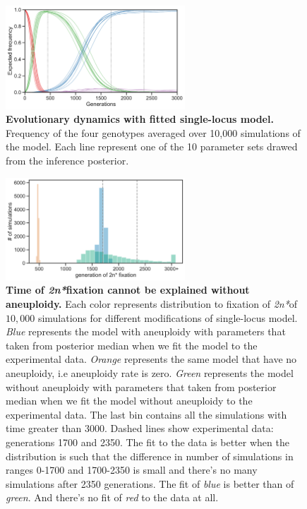 \documentclass[12pt]{extarticle}
\newcommand{\eumt}{\emph{2n*}}
\begin{document}
\begin{figure}[h!]
  \centering
\includegraphics[width=0.6\textwidth]{../figures/ppc-plot.pdf}
  \caption{
  \textbf{Evolutionary dynamics with fitted single-locus model.} 
  Frequency of the four genotypes averaged over 10,000 simulations of the model. Each line represent one of the 10 parameter sets drawed from the inference posterior.
  }
  \label{fig:ppc-plot}
\end{figure}

\begin{figure}[h!]
  \centering
\includegraphics[width=0.6\textwidth]{../figures/fixation-plot.pdf}
  \caption{
  \textbf{Time of \eumt fixation cannot be explained without aneuploidy.}
Each color represents distribution to fixation of \eumt of $10,000$ simulations for different modifications of single-locus model. \emph{Blue} represents the model with aneuploidy with parameters that taken from posterior median when we fit the model to the experimental data. \emph{Orange} represents the same model that have no aneuploidy, i.e aneuploidy rate is zero. \emph{Green} represents the model without aneuploidy with parameters that taken from posterior median when we fit the model without aneuploidy to the experimental data. The last bin contains all the simulations with time greater than 3000.
Dashed lines show experimental data: generations 1700 and 2350. The fit to the data is better when the distribution is such that the difference in number of simulations in ranges 0-1700 and 1700-2350 is small and there's no many simulations after 2350 generations. The fit of \emph{blue} is better than of \emph{green}. And there's no fit of \emph{red} to the data at all.
  }
  \label{fig:2n*-fixation}
\end{figure}
\end{document}
